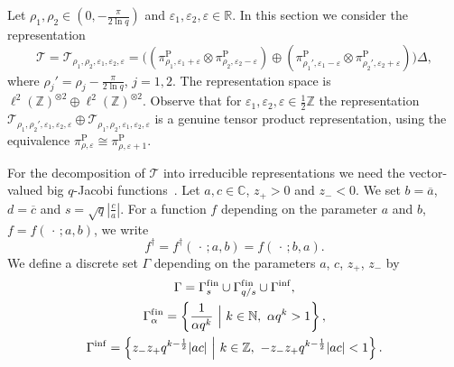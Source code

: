 \documentclass[pdftex]{sigma}
\numberwithin{equation}{section}
\numberwithin{theorem}{section}
\numberwithin{proposition}{section}
\numberwithin{lemma}{section}
\numberwithin{corollary}{section}
\numberwithin{definition}{section}
\numberwithin{example}{section}
\numberwithin{remark}{section}
\numberwithin{note}{section}
\newcommand{\R}{\mathbb R}
\newcommand{\N}{\mathbb N}
\newcommand{\C}{\mathbb C}
\newcommand{\Z}{\mathbb Z}
\newcommand{\eps}{\varepsilon}
\begin{document}
Let $\rho_1,\rho_2 \in (0,-\frac{\pi}{2\ln q})$ and $\eps_1,\eps_2,\eps\in \R$. In this section we consider the representation
\[
\mathcal T = \mathcal T_{\rho_1,\rho_2,\eps_1,\eps_2,\eps} = \Big((\pi_{\rho_1,\eps_1+\eps}^{\mathrm P} \otimes \pi_{\rho_2,\eps_2-\eps}^{\mathrm P}) \oplus  (\pi_{\rho_1',\eps_1-\eps}^{\mathrm P} \otimes \pi_{\rho_2',\eps_2+\eps}^{\mathrm P})\Big)\Delta,
\]
where $\rho_j'=\rho_j-\frac{\pi}{2\ln q}$, $j=1,2$. The representation space is $\ell^2(\Z)^{\otimes 2} \oplus \ell^2(\Z)^{\otimes 2}$. Observe that for $\eps_1,\eps_2,\eps \in \frac12\Z$ the representation $\mathcal T_{\rho_1,\rho_2',\eps_1,\eps_2,\eps} \oplus \mathcal T_{\rho_1,\rho_2,\eps_1,\eps_2,\eps}$ is a genuine tensor product representation, using the equivalence $\pi_{\rho,\eps}^{\mathrm P}\cong\pi_{\rho,\eps+1}^{\mathrm P}$.

For the decomposition of $\mathcal T$ into irreducible representations we need the vector-valued big $q$-Jacobi functions~\cite{Gr09}. Let $a,c \in \C$, $z_+>0$ and $z_-<0$. We set $b=\overline{a}$, $d=\overline{c}$ and $s= \sqrt{q}|\frac{c}{a}|$. For a function $f$ depending on the parameter $a$ and $b$, $f = f(\,\cdot\,;a,b)$, we write
\[
f^\dagger=f^\dagger(\,\cdot\,;a,b)= f(\,\cdot\,;b,a).
\]
We def\/ine a discrete set $\Gamma$ depending on the parameters $a$, $c$, $z_+$, $z_-$ by
\begin{gather*}
\Gamma  =  \Gamma^{\mathrm{f\/in}}_{s} \cup \Gamma^{\mathrm{f\/in}}_{q/s} \cup \Gamma^{\mathrm{inf}},\\
\Gamma^{\mathrm{f\/in}}_\alpha  =  \left\{ \frac{1}{\alpha q^{k} }\ \Big| \ k\in\N,\ \alpha q^{k}>1 \right\},\\
\Gamma^{\mathrm{inf}}  = \left\{ z_-z_+q^{k-\frac12}|ac| \ \Big| \ k \in \Z, \ -z_-z_+q^{k-\frac12}|ac|<1 \right\}.
\end{gather*}
\end{document}
